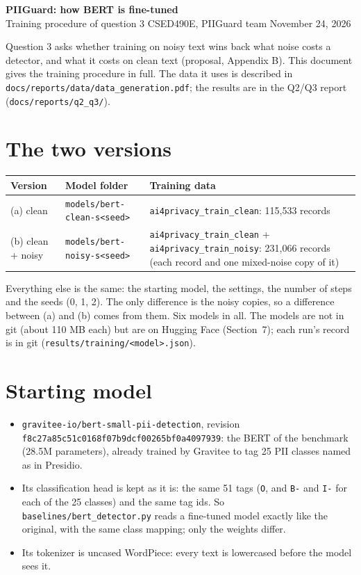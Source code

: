 \documentclass[10pt,a4paper]{article}
\newcommand{\file}[1]{\texttt{#1}}
\begin{document}
\begin{center}
{\Large\bfseries PIIGuard: how BERT is fine-tuned}\\[3pt]
{\small Training procedure of question 3 \textperiodcentered{} CSED490E, PIIGuard team
\textperiodcentered{} November 24, 2026}
\end{center}

Question 3 asks whether training on noisy text wins back what noise costs a detector, and what it
costs on clean text (proposal, Appendix B). This document gives the training procedure in full.
The data it uses is described in \file{docs/reports/data/data\_generation.pdf}; the results are
in the Q2/Q3 report (\file{docs/reports/q2\_q3/}).

\section{The two versions}

\begin{tabularx}{\linewidth}{@{}llL@{}}
\toprule
Version & Model folder & Training data \\
\midrule
(a) clean & \file{models/bert-clean-s<seed>} & \file{ai4privacy\_train\_clean}: 115,533 records \\
(b) clean + noisy & \file{models/bert-noisy-s<seed>} & \file{ai4privacy\_train\_clean} + \file{ai4privacy\_train\_noisy}: 231,066 records (each record and one mixed-noise copy of it) \\
\bottomrule
\end{tabularx}

Everything else is the same: the starting model, the settings, the number of steps and the seeds
(0, 1, 2). The only difference is the noisy copies, so a difference between (a) and (b) comes
from them. Six models in all. The models are not in git (about 110 MB each) but are on Hugging Face (Section~7); each run's record is in git
(\file{results/training/<model>.json}).

\section{Starting model}

\begin{itemize}
\item \file{gravitee-io/bert-small-pii-detection}, revision \file{f8c27a85c51c0168f07b9dcf00265bf0a4097939}:
  the BERT of the benchmark (28.5M parameters), already trained by Gravitee to tag 25 PII classes
  named as in Presidio.
\item Its classification head is kept as it is: the same 51 tags (\file{O}, and \file{B-} and
  \file{I-} for each of the 25 classes) and the same tag ids. So
  \file{baselines/bert\_detector.py} reads a fine-tuned model exactly like the original, with the
  same class mapping; only the weights differ.
\item Its tokenizer is uncased WordPiece: every text is lowercased before the model sees it.
\end{itemize}
\end{document}
